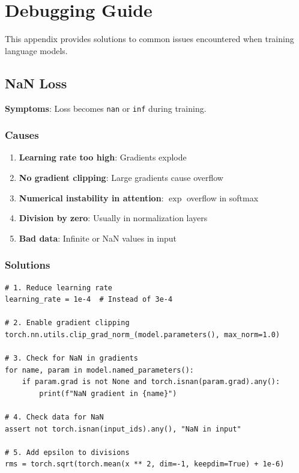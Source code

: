 \chapter{Debugging Guide}
\label{app:debugging}

This appendix provides solutions to common issues encountered when training language models.

\section{NaN Loss}

\textbf{Symptoms}: Loss becomes \texttt{nan} or \texttt{inf} during training.

\subsection{Causes}

\begin{enumerate}
    \item \textbf{Learning rate too high}: Gradients explode
    \item \textbf{No gradient clipping}: Large gradients cause overflow
    \item \textbf{Numerical instability in attention}: $\exp$ overflow in softmax
    \item \textbf{Division by zero}: Usually in normalization layers
    \item \textbf{Bad data}: Infinite or NaN values in input
\end{enumerate}

\subsection{Solutions}

\begin{lstlisting}[style=python]
# 1. Reduce learning rate
learning_rate = 1e-4  # Instead of 3e-4

# 2. Enable gradient clipping
torch.nn.utils.clip_grad_norm_(model.parameters(), max_norm=1.0)

# 3. Check for NaN in gradients
for name, param in model.named_parameters():
    if param.grad is not None and torch.isnan(param.grad).any():
        print(f"NaN gradient in {name}")

# 4. Check data for NaN
assert not torch.isnan(input_ids).any(), "NaN in input"

# 5. Add epsilon to divisions
rms = torch.sqrt(torch.mean(x ** 2, dim=-1, keepdim=True) + 1e-6)
\end{lstlisting}


